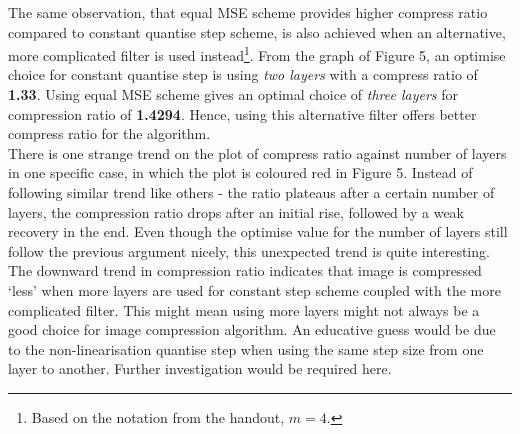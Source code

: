 \documentclass[a4paper, 11pt]{article}
\begin{document}
\noindent
The same observation, that equal MSE scheme provides higher compress ratio compared to constant quantise step scheme, is also achieved when an alternative, more complicated filter is used instead\footnote{Based on the notation from the handout, $m = 4$.}. From the graph of Figure 5, an optimise choice for constant quantise step is using \textit{two layers} with a compress ratio of \textbf{1.33}. Using equal MSE scheme gives an optimal choice of \textit{three layers} for compression ratio of \textbf{1.4294}. Hence, using this alternative filter offers better compress ratio for the algorithm.\\
\noindent
There is one strange trend on the plot of compress ratio against number of layers in one specific case, in which the plot is coloured red in Figure 5. Instead of following similar trend like others - the ratio plateaus after a certain number of layers, the compression ratio drops after an initial rise, followed by a weak recovery in the end. Even though the optimise value for the number of layers still follow the previous argument nicely, this unexpected trend is quite interesting. The downward trend in compression ratio indicates that image is compressed `less' when more layers are used for constant step scheme coupled with the more complicated filter. This might mean using more layers might not always be a good choice for image compression algorithm. An educative guess would be due to the non-linearisation quantise step when using the same step size from one layer to another. Further investigation would be required here. 



\newpage
\end{document}
